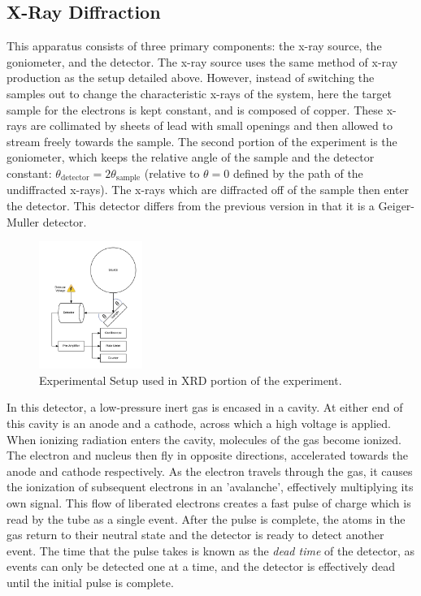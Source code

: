 \documentclass[%
 reprint,
 amsmath,amssymb,
 aps,
 pra,
]{revtex4-1}
\begin{document}
\subsection{X-Ray Diffraction}

This apparatus consists of three primary components: the x-ray source, the goniometer, and the detector. The x-ray source uses the same method of x-ray production as the setup detailed above. However, instead of switching the samples out to change the characteristic x-rays of the system, here the target sample for the electrons is kept constant, and is composed of copper. These x-rays are collimated by sheets of lead with small openings and then allowed to stream freely towards the sample. The second portion of the experiment is the goniometer, which keeps the relative angle of the sample and the detector constant: $\theta_{\text{detector}} = 2\theta_{\text{sample}}$ (relative to $\theta = 0$ defined by the path of the undiffracted x-rays). The x-rays which are diffracted off of the sample then enter the detector. This detector differs from the previous version in that it is a Geiger-Muller detector. 

\begin{figure}[H]
	\centering
	\includegraphics[width=0.3\textwidth]{xrd_experiment.png}
	\caption{Experimental Setup used in XRD portion of the experiment.}
	\label{fig:xrd_setup}
\end{figure}

In this detector, a low-pressure inert gas is encased in a cavity. At either end of this cavity is an anode and a cathode, across which a high voltage is applied. When ionizing radiation enters the cavity, molecules of the gas become ionized. The electron and nucleus then fly in opposite directions, accelerated towards the anode and cathode respectively. As the electron travels through the gas, it causes the ionization of subsequent electrons in an 'avalanche', effectively multiplying its own signal. This flow of liberated electrons creates a fast pulse of charge which is read by the tube as a single event. After the pulse is complete, the atoms in the gas return to their neutral state and the detector is ready to detect another event. The time that the pulse takes is known as the \textit{dead time} of the detector, as events can only be detected one at a time, and the detector is effectively dead until the initial pulse is complete. 
\end{document}
